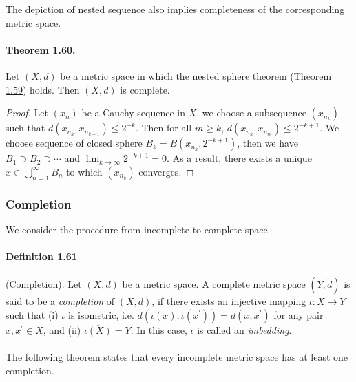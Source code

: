\documentclass{article}
\begin{document}
The depiction of nested sequence also implies completeness of the corresponding metric space.

\paragraph{Theorem 1.60.\label{thm:1.60}} Let $(X,d)$ be a metric space in which the nested sphere theorem (\hyperref[thm:1.59]{Theorem 1.59}) holds. Then $(X,d)$ is complete. 
\begin{proof}
Let $(x_n)$ be a Cauchy sequence in $X$, we choose a subsequence $(x_{n_k})$ such that $d(x_{n_k},x_{n_{k+1}})\leq 2^{-k}$. Then for all $m\geq k$, $d(x_{n_k},x_{n_m})\leq 2^{-k+1}$. We choose sequence of closed sphere $B_k=B(x_{n_k},2^{-k+1})$, then we have $B_1\supset B_2\supset \cdots$ and $\lim_{k\to\infty}2^{-k+1}=0$. As a result, there exists a unique $x\in\bigcup_{n=1}^\infty B_n$ to which $(x_{n_k})$ converges.
\end{proof}

\subsubsection{Completion}
We consider the procedure from incomplete to complete space.
\paragraph{Definition 1.61\label{def:1.61}} (Completion). Let $(X,d)$ be a metric space. A complete metric space $(Y,\tilde{d})$ is said to be a \textit{completion} of $(X,d)$, if there exists an injective mapping $\iota:X\to Y$ such that (i) $\iota$ is isometric, i.e. $\tilde{d}(\iota(x),\iota(x^\prime))=d(x,x^\prime)$ for any pair $x,x^\prime\in X$, and (ii) $\overline{\iota(X)}=Y$. In this case, $\iota$ is called an \textit{imbedding}.

\paragraph{} The following theorem states that every incomplete metric space has at least one completion.
\end{document}
